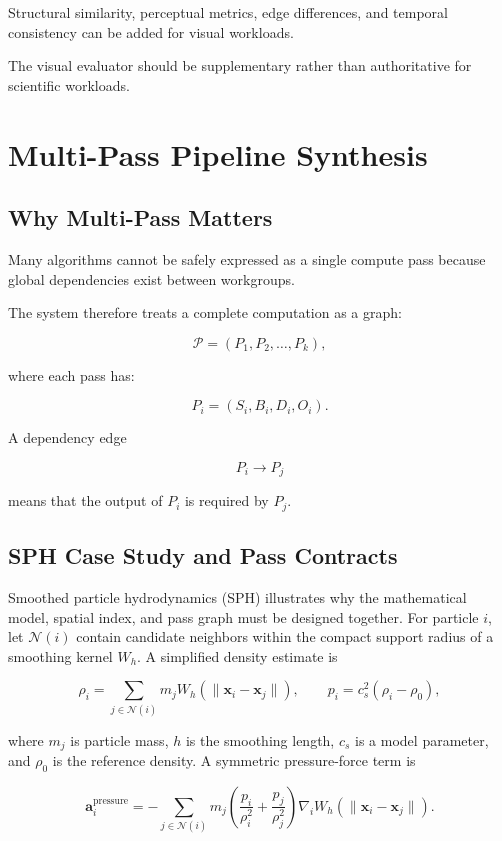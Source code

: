 \documentclass[11pt,a4paper,oneside]{report}
\begin{document}
Structural similarity, perceptual metrics, edge differences, and temporal consistency can be
added for visual workloads.

The visual evaluator should be supplementary rather than authoritative for scientific workloads.

\chapter{Multi-Pass Pipeline Synthesis}

\section{Why Multi-Pass Matters}

Many algorithms cannot be safely expressed as a single compute pass because global dependencies
exist between workgroups.

The system therefore treats a complete computation as a graph:

\[
\mathcal{P}
=
(P_1,P_2,\ldots,P_k),
\]

where each pass has:

\[
P_i=(S_i,B_i,D_i,O_i).
\]

A dependency edge

\[
P_i\rightarrow P_j
\]

means that the output of $P_i$ is required by $P_j$.

\section{SPH Case Study and Pass Contracts}

Smoothed particle hydrodynamics (SPH) illustrates why the mathematical model, spatial index, and
pass graph must be designed together. For particle $i$, let $\mathcal{N}(i)$ contain candidate
neighbors within the compact support radius of a smoothing kernel $W_h$. A simplified density
estimate is

\begin{equation}
\rho_i=\sum_{j\in\mathcal{N}(i)}m_j
W_h\!\left(\|\mathbf{x}_i-\mathbf{x}_j\|\right),
\qquad
p_i=c_s^2(\rho_i-\rho_0),
\end{equation}

where $m_j$ is particle mass, $h$ is the smoothing length, $c_s$ is a model parameter, and
$\rho_0$ is the reference density. A symmetric pressure-force term is

\begin{equation}
\mathbf{a}_i^{\mathrm{pressure}}
=-\sum_{j\in\mathcal{N}(i)}m_j
\left(\frac{p_i}{\rho_i^2}+\frac{p_j}{\rho_j^2}\right)
\nabla_i W_h\!\left(\|\mathbf{x}_i-\mathbf{x}_j\|\right).
\end{equation}
\end{document}

